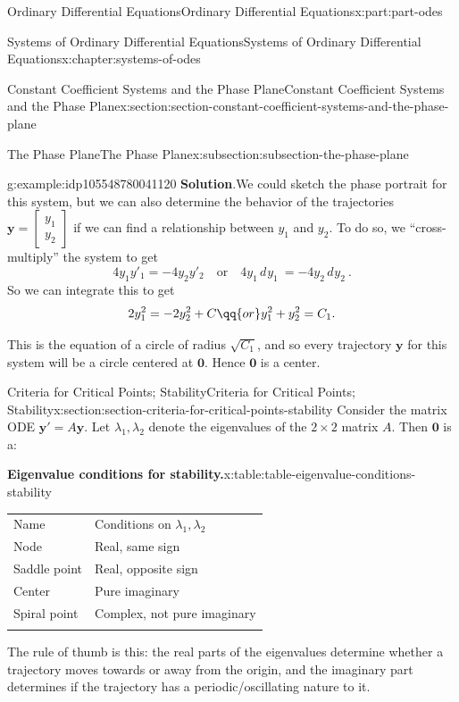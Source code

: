 \documentclass[oneside,10pt,]{book}
\newcommand{\blocktitlefont}{\relax}
\newcommand{\tabularfont}{\relax}
\numberwithin{equation}{part}
\newcommand{\hrulethick} {\noalign{\hrule height 0.11em}}
\renewcommand{\vec}[1]{\mathbf{#1}}
\newcommand{\dd}[2][]{\, d^{#1} #2\ }
\begin{document}
\begin{partptx}{Ordinary Differential Equations}{}{Ordinary Differential Equations}{}{}{x:part:part-odes}
\begin{chapterptx}{Systems of Ordinary Differential Equations}{}{Systems of Ordinary Differential Equations}{}{}{x:chapter:systems-of-odes}
\begin{sectionptx}{Constant Coefficient Systems and the Phase Plane}{}{Constant Coefficient Systems and the Phase Plane}{}{}{x:section:section-constant-coefficient-systems-and-the-phase-plane}
\begin{subsectionptx}{The Phase Plane}{}{The Phase Plane}{}{}{x:subsection:subsection-the-phase-plane}
\begin{example}{}{g:example:idp105548780041120}
\noindent\textbf{\blocktitlefont Solution}.\hypertarget{g:solution:idp105548780043168}{}\quad{}We could sketch the phase portrait for this system, but we can also determine the behavior of the trajectories \(\vec{y} = \begin{bmatrix} y_{1} \\ y_{2} \end{bmatrix} \) if we can find a relationship between \(y_{1}\) and \(y_{2}\). To do so, we ``cross-multiply'' the system to get%
\begin{equation*}
4y_{1}y'_{1} = -4y_{2}y'_{2} \quad\text{or}\quad 4y_{1}\dd{y_{1}} = -4y_{2}\dd{y_{2}}.
\end{equation*}
So we can integrate this to get%
\begin{equation*}
2y_{1}^{2} = -2y_{2}^{2}+C\qq{or}y_{1}^{2}+y_{2}^{2} = C_{1}.
\end{equation*}
%
\par
This is the equation of a circle of radius \(\sqrt{C_{1}}\), and so every trajectory \(\vec{y}\) for this system will be a circle centered at \(\vec{0}\). Hence \(\vec{0}\) is a center.%
\end{example}
\end{subsectionptx}
\end{sectionptx}
%
%
\typeout{************************************************}
\typeout{************************************************}
%
\begin{sectionptx}{Criteria for Critical Points; Stability}{}{Criteria for Critical Points; Stability}{}{}{x:section:section-criteria-for-critical-points-stability}
Consider the matrix ODE \(\vec{y}' = A\vec{y}\). Let \(\lambda_{1},\lambda_{2}\) denote the eigenvalues of the \(2\times 2\) matrix \(A\). Then \(\vec{0}\) is a:%
\begin{tableptx}{\textbf{Eigenvalue conditions for stability.}}{x:table:table-eigenvalue-conditions-stability}{}%
\centering%
{\tabularfont%
\begin{tabular}{ll}\hrulethick
Name&Conditions on \(\lambda_{1},\lambda_{2}\)\tabularnewline\hrulethick
Node&Real, same sign\tabularnewline[0pt]
Saddle point&Real, opposite sign\tabularnewline[0pt]
Center&Pure imaginary\tabularnewline[0pt]
Spiral point&Complex, not pure imaginary\tabularnewline\hrulethick
\end{tabular}
}%
\end{tableptx}%
The rule of thumb is this: the real parts of the eigenvalues determine whether a trajectory moves towards or away from the origin, and the imaginary part determines if the trajectory has a periodic\slash{}oscillating nature to it.%

\end{sectionptx}
\end{chapterptx}
\end{partptx}
\end{document}
